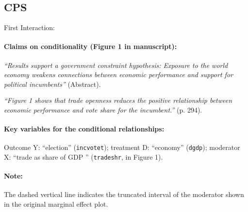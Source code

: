 \documentclass[12pt]{article}
\begin{document}
\subsection{\citet{Hellwig2007} CPS} \label{hellwig}

\noindent First Interaction:

\paragraph{Claims on conditionality (Figure 1 in manuscript):} \emph{``Results support a
  government constraint hypothesis: Exposure to the world economy
  weakens connections between economic performance and support for
  political incumbents''} (Abstract).

\emph{``Figure 1 shows that trade openness reduces the positive
  relationship between economic performance and vote share for the
  incumbent.''} (p. 294).

\paragraph{Key variables for the conditional relationships:} Outcome Y:
``election'' (\texttt{incvotet}); treatment D: ``economy''
(\texttt{dgdp}); moderator X: ``trade as share of GDP '' 
(\texttt{tradeshr}, in Figure 1). 

\paragraph{Note:}  The dashed vertical line indicates the truncated interval of the moderator shown in the original marginal effect plot.
\end{document}
